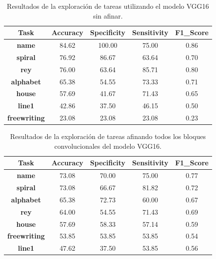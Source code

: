 \documentclass[10pt, a4paper]{article}
\begin{document}
\begin{table}[h!!]
\caption{Resultados de la exploración de tareas utilizando el modelo VGG16 sin afinar.}
\centering
\label{tab:VGG16_Freeze}
\begin{tabular}{ccccc}
\hline
\textbf{Task}        & \textbf{Accuracy} & \textbf{Specificity} & \textbf{Sensitivity} & \textbf{F1\_Score} \\ \hline
\textbf{name}        & 84.62             & 100.00               & 75.00                & 0.86               \\
\textbf{spiral}      & 76.92             & 86.67                & 63.64                & 0.70               \\
\textbf{rey}         & 76.00             & 63.64                & 85.71                & 0.80               \\
\textbf{alphabet}    & 65.38             & 54.55                & 73.33                & 0.71               \\
\textbf{house}       & 57.69             & 41.67                & 71.43                & 0.65               \\
\textbf{line1}       & 42.86             & 37.50                & 46.15                & 0.50               \\
\textbf{freewriting} & 23.08             & 23.08                & 23.08                & 0.23               \\ \hline
\end{tabular}
\end{table}



\begin{table}[h!!]
\caption{Resultados de la exploración de tareas afinando todos los bloques convolucionales 
del modelo VGG16.}
\centering
\label{tab:VGG16_tuned}
\begin{tabular}{ccccc}
\hline
\textbf{Task}        & \textbf{Accuracy} & \textbf{Specificity} & \textbf{Sensitivity} & \textbf{F1\_Score} \\ \hline
\textbf{name}        & 73.08             & 70.00                & 75.00                & 0.77               \\
\textbf{spiral}      & 73.08             & 66.67                & 81.82                & 0.72               \\
\textbf{alphabet}    & 65.38             & 72.73                & 60.00                & 0.67               \\
\textbf{rey}         & 64.00             & 54.55                & 71.43                & 0.69               \\
\textbf{house}       & 57.69             & 58.33                & 57.14                & 0.59               \\
\textbf{freewriting} & 53.85             & 53.85                & 53.85                & 0.54               \\
\textbf{line1}       & 47.62             & 37.50                & 53.85                & 0.56               \\ \hline
\end{tabular}
\end{table}
\end{document}
